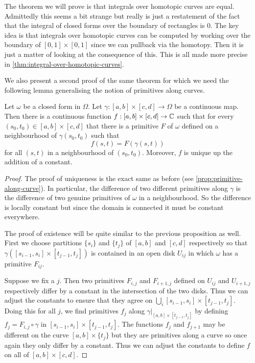 The theorem we will prove is that integrals over homotopic curves are equal. Admittedly this seems a bit strange but really is just a restatement of the fact that the integral of closed forms over the boundary of rectangles is 0. The key idea is that integrals over homotopic curves can be computed by working over the boundary of $[0, 1] \times [0, 1]$ since we can pullback via the homotopy. Then it is just a matter of looking at the consequence of this. This is all made more precise in \autoref{thm:integral-over-homotopic-curves}.

We also present a second proof of the same theorem for which we need the following lemma generalising the notion of primitives along curves.
\begin{lemma}
Let $\omega$ be a closed form in $\Omega$. Let $\gamma: [a, b] \times [c, d] \to \Omega$ be a continuous map. Then there is a continuous function $f: [a, b] \times [c, d] \to \mathbb{C}$ such that for every $(s_0, t_0) \in [a, b] \times [c, d]$ that there is a primitive $F$ of $\omega$ defined on a neighbourhood of $\gamma(s_0, t_0)$ such that
$$ f(s, t) = F(\gamma(s, t))$$
for all $(s, t)$ in a neighbourhood of $(s_0, t_0)$. Moreover, $f$ is unique up the addition of a constant.
\end{lemma}
\begin{proof}
    The proof of uniqueness is the exact same as before (see \autoref{prop:primitive-along-curve}). In particular, the difference of two different primitives along $\gamma$ is the difference of two genuine primitives of $\omega$ in a neighbourhood. So the difference is locally constant but since the domain is connected it must be constant everywhere. 
    
    The proof of existence will be quite similar to the previous proposition as well. First we choose partitions $\{s_i\}$ and $\{t_j\}$ of $[a, b]$ and $[c, d]$ respectively so that $\gamma([s_{i - 1}, s_i] \times [t_{j - 1}, t_j])$ is contained in an open disk $U_{ij}$ in which $\omega$ has a primitive $F_{ij}$.
    
    Suppose we fix a $j$. Then two primitives $F_{i, j}$ and $F_{i + 1, j}$ defined on $U_{ij}$ and $U_{i + 1, j}$ respectively differ by a constant in the intersection of the two disks. Thus we can adjust the constants to ensure that they agree on $\bigcup_i [s_{i - 1}, s_i] \times [t_{j - 1}, t_j]$. Doing this for all $j$, we find primitives $f_j$ along $\gamma|_{[a, b] \times [t_{j - 1}, t_j]}$ by defining $f_j = F_{i, j} \circ \gamma$ in $[s_{i -1}, s_i] \times [t_{j - 1}, t_j]$. The functions $f_j$ and $f_{j + 1}$ may be different on the curve $[a, b]  \times \{t_j\}$ but they are primitives along a curve so once again they only differ by a constant. Thus we can adjust the constants to define $f$ on all of $[a, b] \times [c, d]$.
\end{proof}

